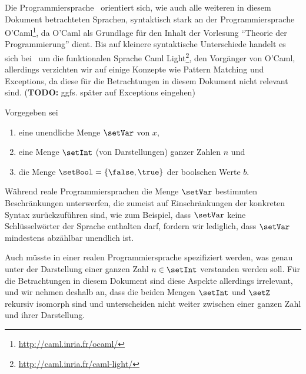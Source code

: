 Die Programmiersprache \Lf\ orientiert sich, wie auch alle weiteren in diesem Dokument betrachteten Sprachen,
syntaktisch stark an der Programmiersprache O'Caml\footnote{\url{http://caml.inria.fr/ocaml/}}, da O'Caml
als Grundlage f\"ur den Inhalt der Vorlesung "`Theorie der Programmierung"' dient. Bis auf kleinere syntaktische
Unterschiede handelt es sich bei \Lf\ um die funktionalen Sprache Caml
Light\footnote{\url{http://caml.inria.fr/caml-light/}}, den Vorg\"anger von O'Caml, allerdings verzichten wir auf
einige Konzepte wie Pattern Matching und Exceptions, da diese f\"ur die Betrachtungen in diesem Dokument nicht
relevant sind. ({\bf TODO:} ggfs. sp\"ater auf Exceptions eingehen)
\begin{definition}
  Vorgegeben sei
  \begin{enumerate}
    \item eine unendliche Menge $\setVar$ von  $x$,
    \item eine Menge $\setInt$ (von Darstellungen) ganzer Zahlen $n$ und
    \item die Menge $\setBool = \{\false,\true\}$ der boolschen Werte $b$.
  \end{enumerate}
\end{definition}
W\"ahrend reale Programmiersprachen die Menge $\setVar$ bestimmten Beschr\"ankungen
unterwerfen, die zumeist auf Einschr\"ankungen der konkreten Syntax zur\"uckzuf\"uhren
sind, wie zum Beispiel, dass $\setVar$ keine Schl\"usselw\"orter der Sprache enthalten
darf, fordern wir lediglich, dass $\setVar$ mindestens abz\"ahlbar unendlich ist.

Auch m\"usste in einer realen Programmiersprache spezifiziert werden, was genau unter
der Darstellung einer ganzen Zahl $n \in \setInt$ verstanden werden soll. F\"ur die
Betrachtungen in diesem Dokument sind diese Aspekte allerdings irrelevant, und wir
nehmen deshalb an, dass die beiden Mengen $\setInt$ und $\setZ$ rekursiv isomorph
sind und unterscheiden nicht weiter zwischen einer ganzen Zahl und ihrer Darstellung.

